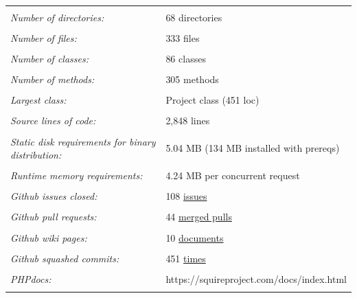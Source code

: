 \documentclass[11pt]{report}
\begin{document}
\begin{tabular}{ p{5cm} p{9cm} }
    \hline
    \\
    \textit{Number of directories:} & 68 directories\\
    \\
    \textit{Number of files:} & 333 files\\
    \\
    \textit{Number of classes:} & 86 classes\\
    \\
    \textit{Number of methods:} & 305 methods\\
    \\
    \textit{Largest class:} & Project class (451 loc) \\
    \\
    \textit{Source lines of code:} & 2,848 lines \\
    \\
    \textit{Static disk requirements for binary distribution:} & 5.04 MB (134 MB installed with prereqs) \\
    \\
    \textit{Runtime memory requirements:} & 4.24 MB per concurrent request \\
    \\
    \textit{Github issues closed:} & 108 \href{https://github.com/uidaho/squireproject/issues}{issues} \\
    \\
    \textit{Github pull requests:} & 44 \href{https://github.com/uidaho/squireproject/pulls}{merged pulls} \\
    \\
    \textit{Github wiki pages:} & 10 \href{https://github.com/uidaho/squireproject/wiki}{documents} \\
    \\
    \textit{Github squashed commits:} & 451 \href{https://github.com/uidaho/squireproject/graphs/contributors}{times} \\
    \\
    \textit{PHPdocs:} & https://squireproject.com/docs/index.html \\
    \\
    \hline
\end{tabular}



\end{document}

